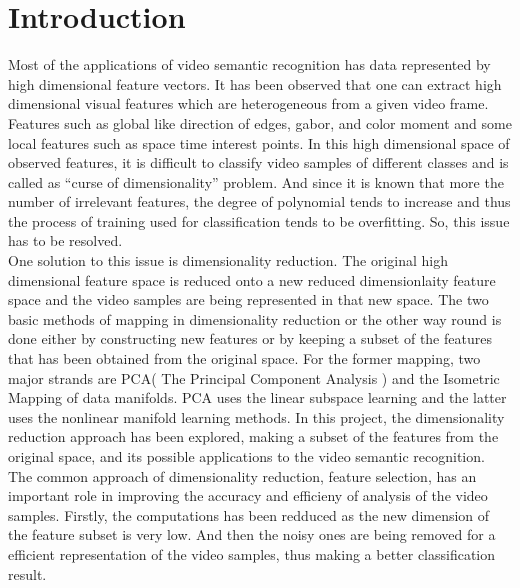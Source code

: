 \documentclass[a4paper,12pt]{article}
\begin{document}
\section{\fontsize{16pt}{1em} Introduction}

Most of the applications of video semantic recognition has data represented by high dimensional feature vectors. It has been observed that one can extract high dimensional visual features which are heterogeneous from a given video frame. Features such as global like direction of edges, gabor, and color moment and some local features such as space time interest points. In this high dimensional space of observed features, it is difficult to classify video samples of different classes and is called as “curse of dimensionality” problem. And since it is known that more the number of irrelevant features, the degree of polynomial tends to increase and thus the process of training used for classification tends to be overfitting. So, this issue has to be resolved.\\
One solution to this issue is dimensionality reduction. The original high dimensional feature space is reduced onto a new reduced dimensionlaity feature space and the video samples are being represented in that new space. The two basic methods of mapping in dimensionality reduction or the other way round is done either by constructing new features or by keeping a subset of the features that has been obtained from the original space. For the former mapping, two major strands are PCA( The Principal Component Analysis ) and the Isometric Mapping of data manifolds. PCA uses the linear subspace learning and the latter uses the nonlinear manifold learning methods. In this project, the dimensionality reduction approach has been explored, making a subset of the features from the original space, and its possible applications to the video semantic recognition. \\
The common approach of dimensionality reduction, feature selection, has an important role in improving the accuracy and efficieny of analysis of the video samples. Firstly, the computations has been redduced as the new dimension of the feature subset is very low. And then the noisy ones are being removed for a efficient representation of the video samples, thus making a better classification result. \\
\end{document}
